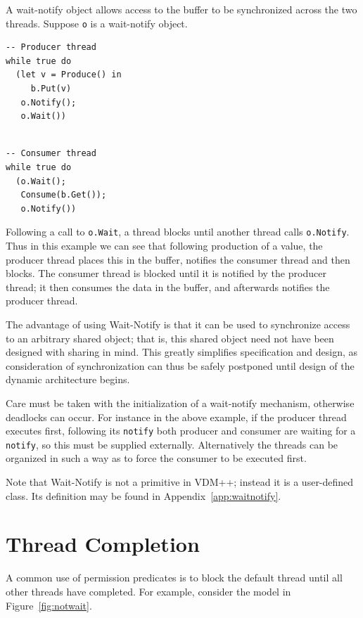 \documentclass{overturerepchap}
\begin{document}
A wait-notify object allows access to the buffer to be synchronized
across the two threads. Suppose \texttt{o} is a wait-notify object.

\begin{multicols}{2}
\begin{lstlisting}
-- Producer thread
while true do
  (let v = Produce() in
     b.Put(v)
   o.Notify();
   o.Wait())
\end{lstlisting}
\begin{lstlisting}

-- Consumer thread
while true do
  (o.Wait();
   Consume(b.Get());
   o.Notify())
\end{lstlisting}
\end{multicols}

Following a call to \texttt{o.Wait}, a thread blocks until another
thread calls \texttt{o.Notify}. Thus in this example we can see that
following production of a value, the producer thread places this in
the buffer, notifies the consumer thread and then blocks. The consumer
thread is blocked until it is notified by the producer thread; it then
consumes the data in the buffer, and afterwards notifies the producer
thread.

The advantage of using Wait-Notify is that it can be used to
synchronize access to an arbitrary shared object; that is, this shared
object need not have been designed with sharing in mind. This greatly
simplifies specification and design, as consideration of
synchronization can thus be safely postponed until design of the
dynamic architecture begins.

Care must be taken with the initialization of a wait-notify mechanism,
otherwise deadlocks can occur. For instance in the above example, if
the producer thread executes first, following its \texttt{notify} both
producer and consumer are waiting for a \texttt{notify}, so this must
be supplied externally. Alternatively the threads can be organized in
such a way as to force the consumer to be executed first.

Note that Wait-Notify is not a primitive in VDM++; instead it is a
user-defined class.  Its definition may be found in
Appendix~\ref{app:waitnotify}.

\section{Thread Completion}

A common use of permission predicates is to block the default thread
until all other threads have completed. For example, consider the
model in Figure~\ref{fig:notwait}.
\end{document}
